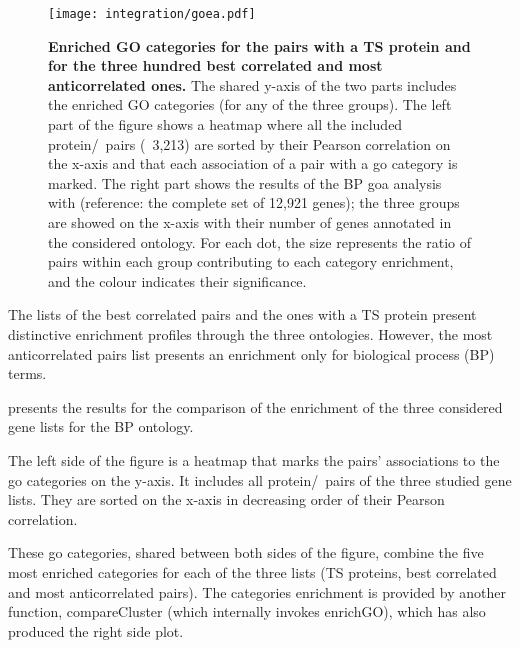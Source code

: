     \begin{sidewaysfigure}
        \texttt{[image: integration/goea.pdf]}\centering
        \vspace{-3mm}
        \caption[Enriched GO categories for the pairs with a TS proteins and for the
        three hundred best correlated and most anticorrelated
        ones]{\label{fig:goares}%
        \textbf{Enriched GO categories for the pairs with a TS protein
        and for the three hundred best correlated
        and most anticorrelated ones.}
        The shared y-axis of the two parts includes the enriched GO categories
        (for any of the three groups).
        The left part of the figure shows
        a heatmap where all the included protein/\mRNA\ pairs (\ie\ 3,213)
        are sorted by their Pearson correlation on the x-axis and
        that each association of a pair with a \gls{go} category is marked.
        The right part shows the results of the BP \gls{goa} analysis
        with  (reference: the complete set of 12,921 genes);
        the three groups are showed on the x-axis with their number of genes
        annotated in the considered ontology.
        For each dot, the size represents the ratio of pairs within each group
        contributing to each category enrichment,
        and the colour indicates their significance.
        }
    \end{sidewaysfigure}


The lists of the best correlated pairs and
the ones with a \gls{TS} protein present distinctive enrichment profiles
through the three ontologies.
However, the most anticorrelated pairs list presents
an enrichment only for biological process (BP) terms.

 presents the results for
the comparison of the enrichment of the three considered gene lists
for the BP ontology.

The left side of the figure is a heatmap
that marks the pairs' associations to the \gls{go} categories on the y-axis.
It includes all protein/\mRNA\ pairs of the three studied gene lists.
They are sorted on the x-axis in decreasing order of their Pearson correlation.

These \gls{go} categories, shared between both sides of the figure,
combine the five most enriched categories
for each of the three lists (\gls{TS} proteins, best correlated
and most anticorrelated pairs).
The categories enrichment is provided by another  function,
\textsf{compareCluster} (which internally invokes \textsf{enrichGO}),
which has also produced the right side plot.\\
\vspace{-\baselineskip}

